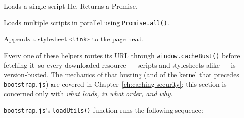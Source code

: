 \begin{description}[style=nextline]
  \item[\texttt{getScript(url)}] Loads a single script file.  Returns a Promise.
  \item[\texttt{getScripts(urls)}] Loads multiple scripts in parallel using \texttt{Promise.all()}.
  \item[\texttt{addStylesheet(url)}] Appends a stylesheet \texttt{<link>} to the page head.
\end{description}

\noindent
Every one of these helpers routes its URL through \texttt{window.cacheBust()} before fetching it, so every downloaded resource --- scripts and stylesheets alike --- is version-busted.  The mechanics of that busting (and of the kernel that precedes \texttt{bootstrap.js}) are covered in Chapter~\ref{ch:caching-security}; this section is concerned only with \emph{what loads, in what order, and why}.

\noindent
\texttt{bootstrap.js}'s \texttt{loadUtils()} function runs the following sequence:

